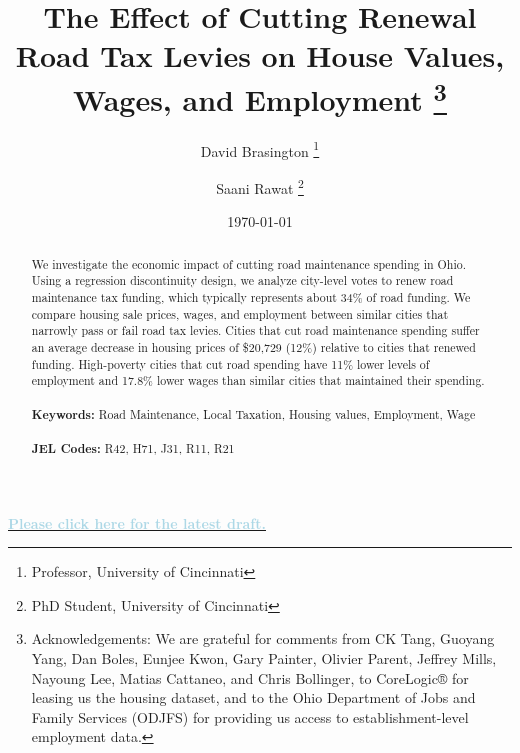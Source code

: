 \documentclass[12pt]{article}
\begin{document}
\begin{titlepage}
\title{The Effect of Cutting Renewal Road Tax Levies on House Values,  Wages, and Employment \thanks{Acknowledgements: We are grateful for comments from CK Tang, Guoyang Yang, Dan Boles, Eunjee Kwon, Gary Painter, Olivier Parent, Jeffrey Mills, Nayoung Lee, Matias Cattaneo, and Chris Bollinger, to CoreLogic® for leasing us the housing dataset, and to the Ohio Department of Jobs and Family Services (ODJFS) for providing us access to establishment-level employment data.}}
\author{David Brasington \thanks{Professor, University of Cincinnati} \and Saani Rawat \thanks{PhD Student, University of Cincinnati}}
\date{\today}
\maketitle

\noindent
\begin{center}
\textbf{\href{https://example.com/latest-draft}{\textcolor{lightblue}{Please click here for the latest draft.}}}
\end{center}

\begin{abstract}
\noindent     We investigate the economic impact of cutting road maintenance spending in Ohio. Using a regression discontinuity design, we analyze city-level votes to renew road maintenance tax funding, which typically represents about 34\% of road funding. We compare housing sale prices, wages, and employment between similar cities that narrowly pass or fail road tax levies. Cities that cut road maintenance spending suffer an average decrease in housing prices of \$20,729 (12\%) relative to cities that renewed funding. High-poverty cities that cut road spending have 11\% lower levels of employment and 17.8\% lower wages than similar cities that maintained their spending. \\
\vspace{0in}\\
\noindent\textbf{Keywords:} Road Maintenance, Local Taxation, Housing values, Employment, Wage \\
\vspace{0in}\\
\noindent\textbf{JEL Codes:} R42, H71, J31, R11, R21 \\

\bigskip
\end{abstract}
\setcounter{page}{0}
\thispagestyle{empty}
\end{titlepage}
\pagebreak \newpage
\end{document}

